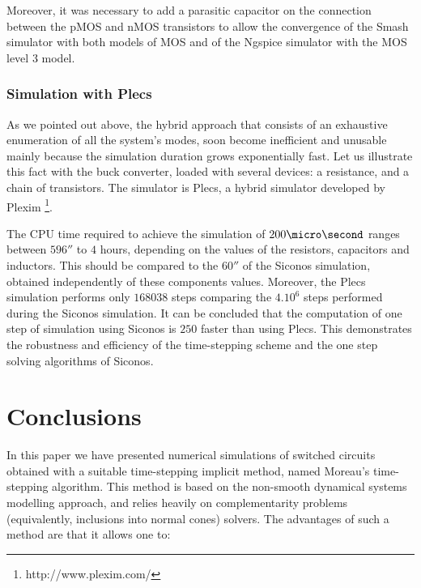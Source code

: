 Moreover, it was necessary to add a parasitic capacitor on the connection between the pMOS and nMOS
transistors to allow the convergence of the {\sc Smash} simulator with both models of MOS
and of the {\sc Ngspice} simulator with the MOS level 3 model.


\subsubsection{Simulation with {\sc Plecs}}

As we pointed out above, the hybrid approach that consists of an exhaustive enumeration of all the
system's modes, soon become inefficient and unusable mainly because the simulation duration grows
exponentially fast. Let us illustrate this fact with the buck converter, loaded with several
devices: a resistance, and a chain of transistors. The simulator is {\sc Plecs}, a hybrid simulator developed by Plexim \footnote{http://www.plexim.com/}. 

The CPU time required to achieve the simulation of $200 \micro\second$ ranges between $596 \second$ to $4$ hours,
depending on the values of the resistors, capacitors and inductors. This should be compared to the
$60\second$ of the {\sc Siconos} simulation, obtained independently of these components values.
Moreover, the {\sc Plecs} simulation performs only $168038$ steps comparing the $4.10^{6}$ steps performed during the {\sc Siconos}
simulation. It can be concluded that the computation of one step of simulation using {\sc Siconos} is $250$
faster than using {\sc Plecs}. This demonstrates the robustness and efficiency of the time-stepping scheme
and the one step solving algorithms of {\sc Siconos}.


\section{Conclusions}
\label{section5}


In this paper we have presented numerical simulations of switched circuits obtained with a suitable time-stepping implicit method, named Moreau's time-stepping algorithm. This method is based on the non-smooth dynamical systems modelling approach, and relies heavily on complementarity problems (equivalently, inclusions into normal cones) solvers. The advantages of such a method are that it allows one to:

